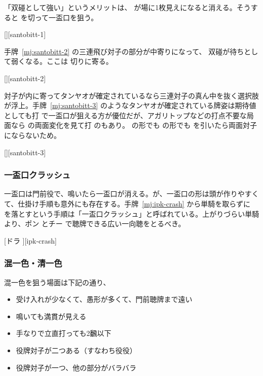 \documentclass[../nankiru_main.tex]{subfiles}
\begin{document}
「双碰として強い」というメリットは、 が場に1枚見えになると消える。そうすると  を切って一盃口を狙う\citep[][p.~35]{zero-teyaku}。

[][santobitt-1]

手牌~\ref{mj:santobitt-2} の三連飛び対子の部分が中寄りになって、 双碰が待ちとして弱くなる。ここは  切りに寄る\citep{yoteru-tobitoitsu}。

[][santobitt-2]

対子が内に寄ってタンヤオが確定されているなら三連対子の真ん中を抜く選択肢が浮上。手牌~\ref{mj:santobitt-3} のようなタンヤオが確定されている牌姿は期待値としても打  で一盃口が狙える方が優位だが、アガリトップなどの打点不要な局面なら  の両面変化を見て打  のもあり。 の形でも  の形でも  を引いたら両面対子にならないため\citep[][p.~117]{uzaku-haikouritsu}。

[][santobitt-3]


\subsubsection*{一盃口クラッシュ}

一盃口は門前役で、鳴いたら一盃口が消える。が、一盃口の形は頭が作りやすくて、仕掛け手順も意外にも存在する。手牌~\ref{mj:ipk-crash} から単騎を取らずに  を落とすという手順は「一盃口クラッシュ」と呼ばれている。上がりづらい単騎より、ポン  とチー  で聴牌できる広い一向聴をとるべき\citep[][p.~36]{zero-teyaku}。

[ドラ ][ipk-crash]


\subsubsection{混一色・清一色}

混一色を狙う場面は下記の通り、

\begin{itemize}
\item 受け入れが少なくて、愚形が多くて、門前聴牌まで遠い\citep{shibukawa-honitsu}
\item 鳴いても満貫が見える\citep{hirasawa-honitsu}
\item 手なりで立直打っても2飜以下\citep{hirasawa-honitsu}
\item 役牌対子が二つある（すなわち役役）\citep[][pp.~96--97]{zero-teyaku}
\item 役牌対子が一つ、他の部分がバラバラ\citep[][pp.~97--98]{zero-teyaku}
\end{itemize}
\end{document}
